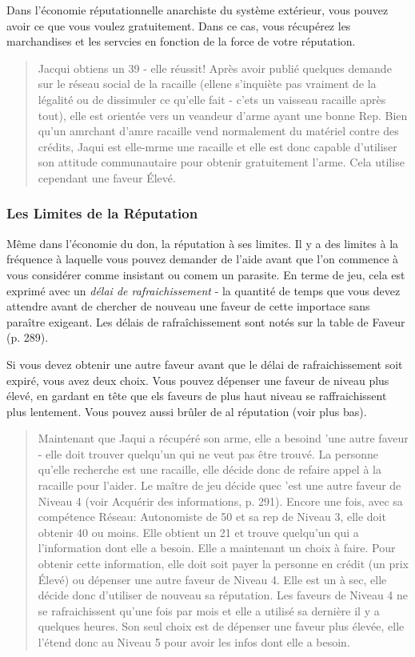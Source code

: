 Dans l'économie réputationnelle anarchiste du système extérieur, vous pouvez avoir ce que vous voulez gratuitement. Dans ce cas, vous récupérez les marchandises et les servcies en fonction de la force de votre réputation. 

\begin{quotation} Jacqui obtiens un 39 - elle réussit! Après avoir publié quelques demande sur le réseau social de la racaille (ellene s'inquiète pas vraiment de la légalité ou de dissimuler ce qu'elle fait - c'ets un vaisseau racaille après tout), elle est orientée vers un veandeur d'arme ayant une bonne Rep. Bien qu'un amrchant d'amre racaille vend normalement du matériel contre des crédits, Jaqui est elle-mrme une racaille et elle est donc capable d'utiliser son attitude communautaire pour obtenir gratuitement l'arme. Cela utilise cependant une faveur Élevé. \end{quotation} 

\subsubsection{Les Limites de la Réputation} 

Même dans l'économie du don, la réputation à ses limites. Il y a des limites à la fréquence à laquelle vous pouvez demander de l'aide avant que l'on commence à vous considérer comme insistant ou comem un parasite. En terme de jeu, cela est exprimé avec un \textit{délai de rafraichissement} - la quantité de temps que vous devez attendre avant de chercher de nouveau une faveur de cette importace sans paraître exigeant. Les délais de rafraîchissement sont notés sur la table de Faveur (p. 289). 

Si vous devez obtenir une autre faveur avant que le délai de rafraichissement soit expiré, vous avez deux choix. Vous pouvez dépenser une faveur de niveau plus élevé, en gardant en tête que els faveurs de plus haut niveau se raffraichissent plus lentement. Vous pouvez aussi brûler de al réputation (voir plus bas). 

\begin{quotation} Maintenant que Jaqui a récupéré son arme, elle a besoind 'une autre faveur - elle doit trouver quelqu'un qui ne veut pas être trouvé. La personne qu'elle recherche est une racaille, elle décide donc de refaire appel à la racaille pour l'aider. Le maître de jeu décide quec 'est une autre faveur de Niveau 4 (voir Acquérir des informations, p. 291). Encore une fois, avec sa compétence Réseau: Autonomiste de 50 et sa rep de Niveau 3, elle doit obtenir 40 ou moins. Elle obtient un 21 et trouve quelqu'un qui a l'information dont elle a besoin. Elle a maintenant un choix à faire. Pour obtenir cette information, elle doit soit payer la personne en crédit (un prix Élevé) ou dépenser une autre faveur de Niveau 4. Elle est un à sec, elle décide donc d'utiliser de nouveau sa réputation. Les faveurs de Niveau 4 ne se rafraichissent qu'une fois par mois et elle a utilisé sa dernière il y a quelques heures. Son seul choix est de dépenser une faveur plus élevée, elle l'étend donc au Niveau 5 pour avoir les infos dont elle a besoin. \end{quotation} 

